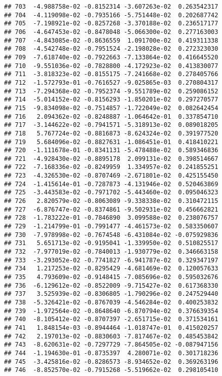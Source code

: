 \documentclass[
]{article}
\begin{document}
\begin{verbatim}
## 703  -4.988758e-02 -0.8152314 -3.607263e-02  0.263542317
## 704  -4.119098e-02 -0.7935166 -5.751448e-02  0.202687742
## 705  -7.198921e-02 -0.8257268 -3.370188e-02  0.236517177
## 706  -4.647453e-02 -0.8478048 -5.066300e-02  0.277163003
## 707  -4.843085e-02 -0.8636559  1.091700e-02  0.419311338
## 708  -4.542748e-02 -0.7951524 -2.198028e-02  0.272323030
## 709  -7.618740e-02 -0.7922663 -7.133864e-02  0.416645520
## 710  -9.551036e-02 -0.7828800 -4.172923e-02  0.413830077
## 711  -3.818323e-02 -0.8155175 -7.241668e-02  0.278405766
## 712  -1.572793e-01 -0.7616527 -9.025865e-03  0.270804317
## 713  -7.294368e-02 -0.7952374 -9.551789e-02  0.259086152
## 714  -5.014152e-02 -0.8156293 -1.850201e-02  0.297270577
## 715  -9.834098e-02 -0.7514857 -1.722049e-02  0.082642454
## 716   2.094362e-02 -0.8248887 -1.064642e-01  0.337854710
## 717  -3.144622e-02 -0.7941571 -5.318913e-02  0.089018205
## 718   5.767724e-02 -0.8816873 -8.624324e-02  0.391977520
## 719   5.684096e-02 -0.8827631 -1.086451e-01  0.418410221
## 720  -1.111678e-01 -0.8341131 -5.478488e-02  0.589346836
## 721  -4.928430e-02 -0.8895178  2.099131e-02  0.398514667
## 722  -7.168336e-02 -0.8249959  1.334957e-02  0.241855251
## 723  -4.326530e-02 -0.8707469 -2.671801e-02  0.425155450
## 724  -1.415614e-01 -0.7287873 -4.131946e-02  0.520463869
## 725  -3.443583e-02 -0.7971702 -5.443460e-02  0.095046323
## 726   2.820579e-02 -0.8063089 -9.338338e-02  0.310472115
## 727  -6.876747e-02 -0.8374861 -9.502931e-02  0.456662821
## 728  -1.783222e-01 -0.7846890  3.099588e-02  0.238076757
## 729  -1.214799e-01 -0.7991477 -4.461573e-02  0.583350607
## 730  -7.978998e-02 -0.7674548 -6.431084e-02 -0.075929836
## 731   5.651713e-02 -0.9195041 -1.339950e-02  0.510825517
## 732  -7.977019e-02 -0.7840013 -1.930779e-02  0.346663158
## 733  -3.293052e-02 -0.7741827 -6.941787e-02  0.329347197
## 734   1.217253e-02 -0.8295429 -4.681469e-02  0.120057633
## 735   4.793609e-02 -0.9148415 -7.085696e-02  0.595032676
## 736  -6.129612e-02 -0.8522009 -9.715427e-02  0.617368330
## 737   3.525939e-02 -0.8306805 -1.790296e-02  0.247529440
## 738  -5.326421e-02 -0.8767039 -4.546284e-02  0.400253832
## 739  -1.972564e-02 -0.8648640 -6.870794e-02  0.376639354
## 740  -8.105412e-02 -0.8707397 -2.651715e-02  0.371534161
## 741   1.848154e-03 -0.8944464 -1.018747e-01  0.415020257
## 742   2.197013e-02 -0.8830603 -7.817467e-02  0.485453842
## 743  -8.620631e-02 -0.7297729 -7.864505e-02 -0.087947156
## 744  -1.194630e-01 -0.8735397  4.280071e-02  0.301718236
## 745  -3.425816e-02 -0.8286573 -8.934652e-02  0.369263196
## 746  -8.852570e-02 -0.7915268 -5.519662e-02  0.298105410

\end{verbatim}
\end{document}
